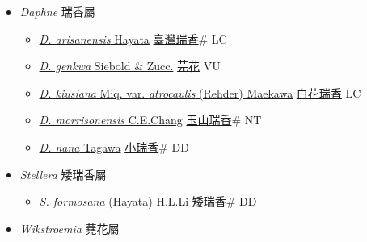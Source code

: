 
  \begin{itemize}
 \item[] \textit{Daphne} 瑞香屬
                    
  \begin{itemize}
        \item[] \href{http://www.theplantlist.org/tpl1.1/search?q=Daphne+arisanensis}{\textit{D. arisanensis} Hayata}   \href{\detokenize{http://taibnet.sinica.edu.tw/chi/taibnet_species_list.php?T2=臺灣瑞香&T2_new_value=true&fr=y}}{臺灣瑞香}\# LC
        \item[] \href{http://www.theplantlist.org/tpl1.1/search?q=Daphne+genkwa}{\textit{D. genkwa} Siebold \& Zucc.}   \href{\detokenize{http://taibnet.sinica.edu.tw/chi/taibnet_species_list.php?T2=芫花&T2_new_value=true&fr=y}}{芫花} VU
        \item[] \href{http://www.theplantlist.org/tpl1.1/search?q=Daphne+kiusiana+var.+atrocaulis}{\textit{D. kiusiana} Miq. var. \textit{atrocaulis} (Rehder) Maekawa}   \href{\detokenize{http://taibnet.sinica.edu.tw/chi/taibnet_species_list.php?T2=白花瑞香&T2_new_value=true&fr=y}}{白花瑞香} LC
        \item[] \href{http://www.theplantlist.org/tpl1.1/search?q=Daphne+morrisonensis}{\textit{D. morrisonensis} C.E.Chang}   \href{\detokenize{http://taibnet.sinica.edu.tw/chi/taibnet_species_list.php?T2=玉山瑞香&T2_new_value=true&fr=y}}{玉山瑞香}\# NT
        \item[] \href{http://www.theplantlist.org/tpl1.1/search?q=Daphne+nana}{\textit{D. nana} Tagawa}   \href{\detokenize{http://taibnet.sinica.edu.tw/chi/taibnet_species_list.php?T2=小瑞香&T2_new_value=true&fr=y}}{小瑞香}\# DD
  \end{itemize}
 \item[] \textit{Stellera} 矮瑞香屬
                    
  \begin{itemize}
        \item[] \href{http://www.theplantlist.org/tpl1.1/search?q=Stellera+formosana}{\textit{S. formosana} (Hayata) H.L.Li}   \href{\detokenize{http://taibnet.sinica.edu.tw/chi/taibnet_species_list.php?T2=矮瑞香&T2_new_value=true&fr=y}}{矮瑞香}\# DD
  \end{itemize}
 \item[] \textit{Wikstroemia} 蕘花屬
                    

\end{itemize}
